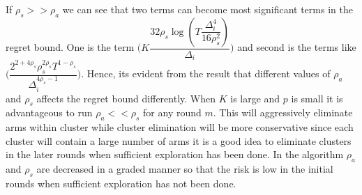 \begin{remark}
\label{App:C:Rem:1}

	If $\rho_{s}>>\rho_{a}$ we can see that two terms can become most significant terms in the regret bound. One is the term  $\bigg(K\dfrac{32\rho_{s}\log{(T\dfrac{\Delta_{i}^{4}}{16\rho_{s}^{2}})}}{\Delta_{i}}\bigg)$ and second is the terms like $\bigg(\dfrac{2^{2+4\rho_{s}}\rho_{s}^{2\rho_{s}}T^{1-\rho_{s}}}{\Delta_{i}^{4\rho_{s}-1}}\bigg)$. Hence, its evident from the result that different values of $\rho_{a}$ and $\rho_{s}$ affects the regret bound differently. When $K$ is large and $p$ is small it is advantageous to run $\rho_{a} << \rho_{s}$ for any round $m$. This will aggressively eliminate arms within cluster while cluster elimination will be more conservative since each cluster will contain a large number of arms it is a good idea to eliminate clusters in the later rounds when sufficient exploration has been done. In the algorithm $\rho_{a}$ and $\rho_{s}$ are decreased in a graded manner so that the risk is low in the initial rounds when sufficient exploration has not been done.
\end{remark}


